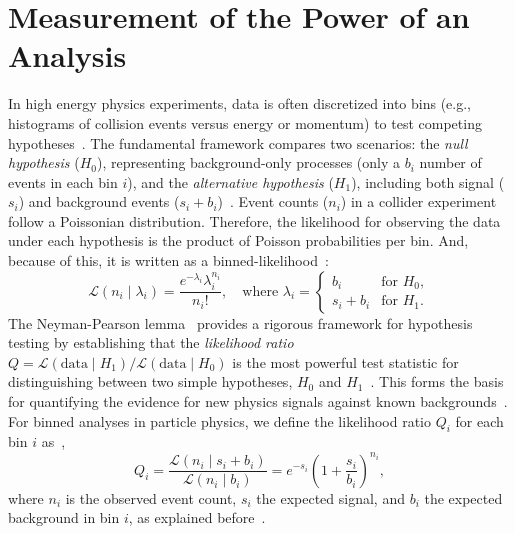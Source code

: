 \section{Measurement of the Power of an Analysis}
\label{sec:power_analysis}

In high energy physics experiments, data is often discretized into bins (e.g., histograms of collision events versus energy or momentum) to test competing hypotheses~\cite{BakerCousins:1984}. The fundamental framework compares two scenarios: the \textit{null hypothesis} ($H_0$), representing background-only processes (only a $b_i$ number of events in each bin $i$), and the \textit{alternative hypothesis} ($H_1$), including both signal ($s_i$) and background events ($s_i + b_i$)~\cite{NeymanPearson:1933}. Event counts ($n_i$) in a collider experiment follow a Poissonian distribution. Therefore,  the likelihood for observing the data under each hypothesis is the product of Poisson probabilities per bin. And, because of this, it is  written as a binned-likelihood~\cite{BakerCousins:1984,Cowan:2011}:
\begin{equation}
    \mathcal{L}(n_i \mid \lambda_i) = \frac{e^{-\lambda_i} \lambda_i^{n_i}}{n_i!}, \quad \text{where } \lambda_i = 
    \begin{cases}
        b_i & \text{for } H_0, \\
        s_i + b_i & \text{for } H_1.
    \end{cases}
\end{equation}
The Neyman-Pearson lemma~\parencite{NeymanPearson:1933,Segura:2024srj} provides a rigorous framework for hypothesis testing by establishing that the \textit{likelihood ratio} $Q = \mathcal{L}(\text{data} \mid H_1)/\mathcal{L}(\text{data} \mid H_0)$ is the most powerful test statistic for distinguishing between two simple hypotheses, $H_0$ and $H_1$~\cite{NeymanPearson:1933,Cowan:2011}. This forms the basis for quantifying the evidence for new physics signals against known backgrounds~\cite{Cowan:2011,Read:2002}. For binned analyses in particle physics, we define the likelihood ratio $Q_i$ for each bin $i$ as~\cite{BakerCousins:1984,Cowan:2011},
\begin{equation}
Q_i = \frac{\mathcal{L}(n_i \mid s_i + b_i)}{\mathcal{L}(n_i \mid b_i)} = e^{-s_i} \left( 1+\frac{s_i}{b_i} \right)^{n_i},
\end{equation}
where $n_i$ is the observed event count, $s_i$ the expected signal, and $b_i$ the expected background in bin $i$, as explained before~\cite{BakerCousins:1984,Cowan:2011}. 

